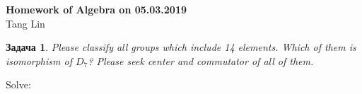\documentclass[a4paper,12pt]{article}
\theoremstyle{neosn}
\newtheorem{problem}{Задача}
\begin{document}
    \begin{center}
        {\bf \Large Homework of Algebra on 05.03.2019}\\
        Tang Lin
    \end{center}

    \begin{problem}
        Please classify all groups which include 14 elements. Which of them is isomorphism of $D_7$? Please seek center and commutator of all of them.
    \end{problem}
    Solve:\\
    
\end{document}
